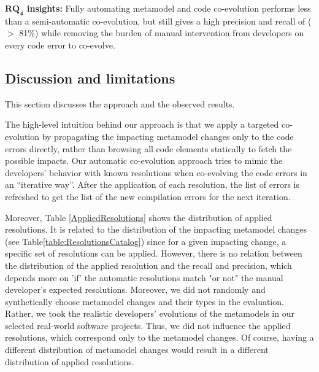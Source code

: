 	
	\begin{tcolorbox}[boxsep=-2pt]
	\textbf{$\boldsymbol{RQ_4}$ insights:}
	Fully automating metamodel and code co-evolution performs less than a semi-automatic co-evolution, but still gives a high precision and recall of ($>$ 81\%) while removing the burden of manual intervention from developers on every code error to co-evolve. 
	\end{tcolorbox}
	
	
	\subsection{Discussion and limitations}
	This section discusses the approach and the observed results. 
	
	The high-level intuition behind our approach is that we apply a targeted co-evolution by propagating the impacting metamodel changes only to the code errors directly, rather than browsing all code elements statically to fetch the possible impacts.
	Our automatic co-evolution approach tries to mimic the developers' behavior with known resolutions when co-evolving the code errors in an “iterative way”. After the application of each resolution, the list of errors %
	is refreshed to get the list of the new compilation errors for the next iteration.
	
	Moreover, Table \ref{AppliedResolutions} shows the distribution of applied resolutions. It is related to the distribution of the impacting metamodel changes (see Table\ref{table:ResolutionsCatalog}) since for a given impacting change, a specific set of resolutions can be applied. 
	However, there is no relation between the distribution of the applied resolution and the recall and precision, which depends more on 'if' the automatic resolutions match "or not" the manual developer’s expected resolutions. Moreover, we did not randomly and synthetically choose metamodel changes and their types in the evaluation. Rather, we took the realistic developers' evolutions of the metamodels in our selected real-world software projects. Thus, we did not influence the applied resolutions, which correspond only to the metamodel changes. Of course, having a different distribution of metamodel changes would result in a different distribution of applied resolutions. 
	
